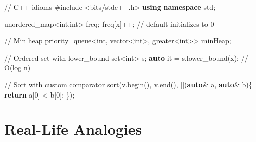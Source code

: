 \documentclass[11pt]{article}
\newenvironment{Shaded}{\begin{snugshade}}{\end{snugshade}}
\newcommand{\CommentTok}[1]{\textcolor[rgb]{0.48,0.49,0.49}{#1}}
\newcommand{\ControlFlowTok}[1]{\textcolor[rgb]{0.99,0.74,0.29}{\textbf{#1}}}
\newcommand{\DataTypeTok}[1]{\textcolor[rgb]{0.16,0.50,0.73}{#1}}
\newcommand{\DecValTok}[1]{\textcolor[rgb]{0.96,0.45,0.00}{#1}}
\newcommand{\ImportTok}[1]{\textcolor[rgb]{0.15,0.68,0.38}{#1}}
\newcommand{\KeywordTok}[1]{\textcolor[rgb]{0.81,0.81,0.76}{\textbf{#1}}}
\newcommand{\NormalTok}[1]{\textcolor[rgb]{0.81,0.81,0.76}{#1}}
\newcommand{\OperatorTok}[1]{\textcolor[rgb]{0.81,0.81,0.76}{#1}}
\newcommand{\PreprocessorTok}[1]{\textcolor[rgb]{0.15,0.68,0.38}{#1}}
\begin{document}
\begin{Shaded}
\begin{Highlighting}[]
\CommentTok{// C++ idioms}
\PreprocessorTok{\#include }\ImportTok{\textless{}bits/stdc++.h\textgreater{}}
\KeywordTok{using} \KeywordTok{namespace}\NormalTok{ std}\OperatorTok{;}

\NormalTok{unordered\_map}\OperatorTok{\textless{}}\DataTypeTok{int}\OperatorTok{,}\DataTypeTok{int}\OperatorTok{\textgreater{}}\NormalTok{ freq}\OperatorTok{;}
\NormalTok{freq}\OperatorTok{[}\NormalTok{x}\OperatorTok{]++;}  \CommentTok{// default{-}initializes to 0}

\CommentTok{// Min heap}
\NormalTok{priority\_queue}\OperatorTok{\textless{}}\DataTypeTok{int}\OperatorTok{,}\NormalTok{ vector}\OperatorTok{\textless{}}\DataTypeTok{int}\OperatorTok{\textgreater{},}\NormalTok{ greater}\OperatorTok{\textless{}}\DataTypeTok{int}\OperatorTok{\textgreater{}\textgreater{}}\NormalTok{ minHeap}\OperatorTok{;}

\CommentTok{// Ordered set with lower\_bound}
\NormalTok{set}\OperatorTok{\textless{}}\DataTypeTok{int}\OperatorTok{\textgreater{}}\NormalTok{ s}\OperatorTok{;}
\KeywordTok{auto}\NormalTok{ it }\OperatorTok{=}\NormalTok{ s}\OperatorTok{.}\NormalTok{lower\_bound}\OperatorTok{(}\NormalTok{x}\OperatorTok{);}  \CommentTok{// O(log n)}

\CommentTok{// Sort with custom comparator}
\NormalTok{sort}\OperatorTok{(}\NormalTok{v}\OperatorTok{.}\NormalTok{begin}\OperatorTok{(),}\NormalTok{ v}\OperatorTok{.}\NormalTok{end}\OperatorTok{(),} \OperatorTok{[](}\KeywordTok{auto}\OperatorTok{\&}\NormalTok{ a}\OperatorTok{,} \KeywordTok{auto}\OperatorTok{\&}\NormalTok{ b}\OperatorTok{)\{} \ControlFlowTok{return}\NormalTok{ a}\OperatorTok{[}\DecValTok{0}\OperatorTok{]} \OperatorTok{\textless{}}\NormalTok{ b}\OperatorTok{[}\DecValTok{0}\OperatorTok{];} \OperatorTok{\});}
\end{Highlighting}
\end{Shaded}

\section{Real-Life Analogies}\label{real-life-analogies}
\end{document}
